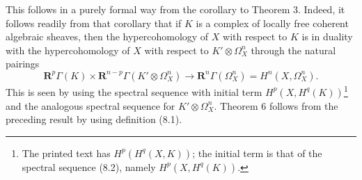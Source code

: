 This follows in a purely formal way from the corollary to Theorem 3. Indeed, it
follows readily from that corollary that if $K$ is a complex of locally free
coherent algebraic sheaves, then the hypercohomology of $X$ with respect to
$K$ is in duality with the hypercohomology of $X$ with respect to
$K'\otimes\Omega_X^{n}$ through the natural pairings
\begin{equation}\tag{8.7}
  \mathbf R^{p}\Gamma(K)
  \times\mathbf R^{n-p}\Gamma(K'\otimes\Omega_X^{n})
  \longrightarrow\mathbf R^{n}\Gamma(\Omega_X^{n})
  =H^{n}(X,\Omega_X^{n}).
\end{equation}
This is seen by using the spectral sequence with initial term
$H^{p}(X,H^{q}(K))$\footnote{The printed text has
$H^{p}(H^{q}(X,K))$; the initial term is that of the spectral sequence (8.2),
namely $H^{p}(X,H^{q}(K))$.} and the analogous spectral sequence for
$K'\otimes\Omega_X^{n}$. Theorem 6 follows from the preceding result by using
definition (8.1).

